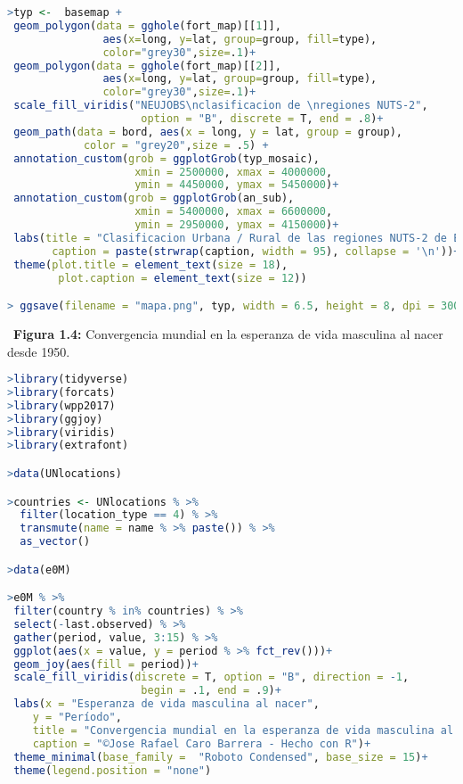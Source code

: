\begin{lstlisting}[language=R, caption=C\'odigo R para la elaboraci\'on de la clasificaci\'on urbana/rural regiones NUTS-2 correspondiente a la figura 1.3]
>typ <-  basemap + 
 geom_polygon(data = gghole(fort_map)[[1]], 
               aes(x=long, y=lat, group=group, fill=type),
               color="grey30",size=.1)+
 geom_polygon(data = gghole(fort_map)[[2]], 
               aes(x=long, y=lat, group=group, fill=type),
               color="grey30",size=.1)+
 scale_fill_viridis("NEUJOBS\nclasificacion de \nregiones NUTS-2", 
                     option = "B", discrete = T, end = .8)+
 geom_path(data = bord, aes(x = long, y = lat, group = group),
            color = "grey20",size = .5) + 
 annotation_custom(grob = ggplotGrob(typ_mosaic), 
                    xmin = 2500000, xmax = 4000000, 
                    ymin = 4450000, ymax = 5450000)+
 annotation_custom(grob = ggplotGrob(an_sub), 
                    xmin = 5400000, xmax = 6600000, 
                    ymin = 2950000, ymax = 4150000)+
 labs(title = "Clasificacion Urbana / Rural de las regiones NUTS-2 de Europa\n",
       caption = paste(strwrap(caption, width = 95), collapse = '\n'))+
 theme(plot.title = element_text(size = 18),
        plot.caption = element_text(size = 12))

> ggsave(filename = "mapa.png", typ, width = 6.5, height = 8, dpi = 300)
\end{lstlisting}


\noindent \textbullet\hspace{0.3cm} \textbf{Figura 1.4:} Convergencia mundial en la esperanza de vida masculina al nacer desde 1950.

\begin{lstlisting}[language=R, caption=C\'odigo R para la elaboraci\'on de la convergencia mundial en la esperanza de vida masculina al nacer correspondiente a la figura 1.4]
>library(tidyverse)
>library(forcats)
>library(wpp2017)
>library(ggjoy)
>library(viridis)
>library(extrafont)

>data(UNlocations)

>countries <- UNlocations % >% 
  filter(location_type == 4) % >% 
  transmute(name = name % >% paste()) % >% 
  as_vector()

>data(e0M) 

>e0M % >% 
 filter(country % in% countries) % >% 
 select(-last.observed) % >% 
 gather(period, value, 3:15) % >% 
 ggplot(aes(x = value, y = period % >% fct_rev()))+
 geom_joy(aes(fill = period))+
 scale_fill_viridis(discrete = T, option = "B", direction = -1, 
                     begin = .1, end = .9)+
 labs(x = "Esperanza de vida masculina al nacer",
    y = "Período",
    title = "Convergencia mundial en la esperanza de vida masculina al nacer desde 1950",
    caption = "©Jose Rafael Caro Barrera - Hecho con R")+
 theme_minimal(base_family =  "Roboto Condensed", base_size = 15)+
 theme(legend.position = "none")
\end{lstlisting}

